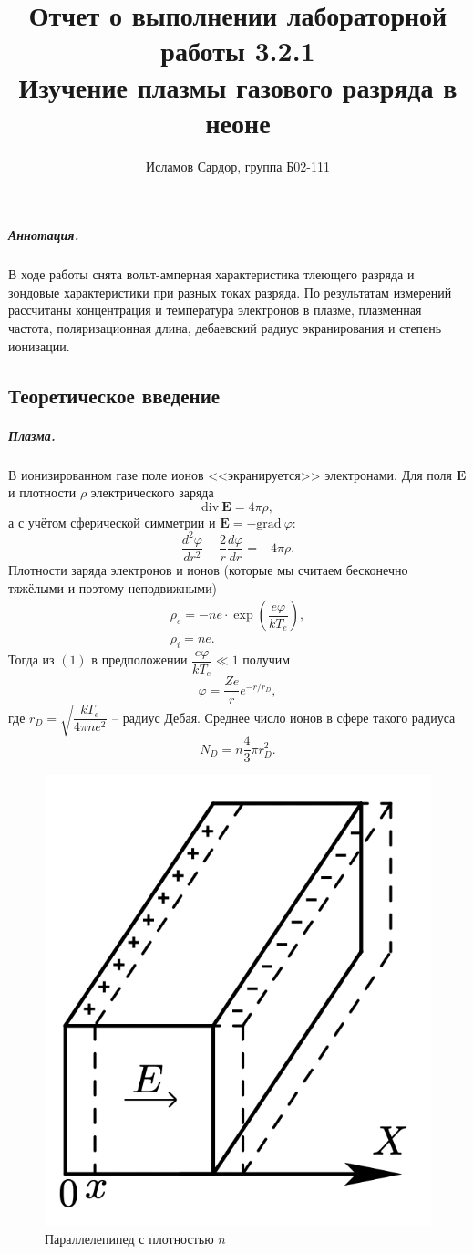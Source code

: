 \documentclass[12pt,a4paper]{article}
\title{Отчет о выполнении лабораторной работы 3.2.1\\
Изучение плазмы газового разряда в неоне}
\author{Исламов Сардор, группа Б02-111}
\begin{document}
\maketitle

\subparagraph*{Аннотация.} В ходе работы снята вольт-амперная характеристика тлеющего разряда и зондовые характеристики при разных токах разряда.
По результатам измерений рассчитаны концентрация и температура электронов в плазме, плазменная частота, поляризационная длина, дебаевский радиус экранирования и степень ионизации.

\subsection*{Теоретическое введение}
\subparagraph*{Плазма.}В ионизированном газе поле ионов <<экранируется>> электронами. 
Для поля $\mathbf{E}$ и плотности $\rho$ электрического заряда
\[\text{div}~\mathbf{E} = 4 \pi \rho,\]
а с учётом сферической симметрии и $\mathbf{E} = -\text{grad}~\varphi$:
\begin{equation}
    \dfrac{d^2 \varphi}{dr^2}+\dfrac{2}{r}\dfrac{d\varphi}{dr}=-4\pi \rho.
\end{equation}
Плотности заряда электронов и ионов (которые мы считаем бесконечно тяжёлыми и поэтому неподвижными)
\begin{equation}
    \begin{array}{c}
        \rho_e = -ne \cdot \exp\left(\dfrac{e\varphi}{kT_e}\right),\\
        \rho_i = ne.
    \end{array}
\end{equation}
Тогда из $(1)$ в предположении $\dfrac{e\varphi}{kT_e} \ll 1$ получим
\begin{equation}
    \varphi = \dfrac{Ze}{r}e^{-r/r_D},
\end{equation}
где $r_D = \sqrt{\dfrac{kT_e}{4\pi n e^2}}$ -- радиус Дебая. 
Среднее число ионов в сфере такого радиуса 
\begin{equation}
    N_D = n\dfrac{4}{3}\pi r_D^2.
\end{equation}

\begin{figure}
    \centering
    \includegraphics[width=0.6\linewidth]{pics/1.png}
    \caption{\small{Параллелепипед с плотностью $n$}}
\end{figure}  
\end{document}
